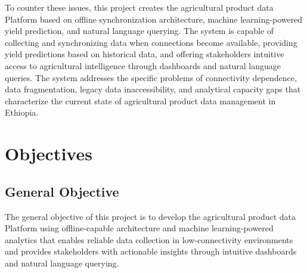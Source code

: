 \documentclass[12pt,a4paper,oneside]{report}
\begin{document}
To counter these issues, this project creates the agricultural product data Platform based on offline synchronization architecture, machine learning-powered yield prediction, and natural language querying. The system is capable of collecting and synchronizing data when connections become available, providing yield predictions based on historical data, and offering stakeholders intuitive access to agricultural intelligence through dashboards and natural language queries. The system addresses the specific problems of connectivity dependence, data fragmentation, legacy data inaccessibility, and analytical capacity gaps that characterize the current state of agricultural product data management in Ethiopia.

\section{Objectives}
\subsection{General Objective}
The general objective of this project is to develop the agricultural product data Platform using offline-capable architecture and machine learning-powered analytics that enables reliable data collection in low-connectivity environments and provides stakeholders with actionable insights through intuitive dashboards and natural language querying.
\end{document}
